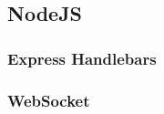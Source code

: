 \subsection{NodeJS}
\label{sec:nodejs}

\subsubsection{Express Handlebars}
\label{sec:express handlebars}

\subsubsection{WebSocket}
\label{sec:WebSocket}